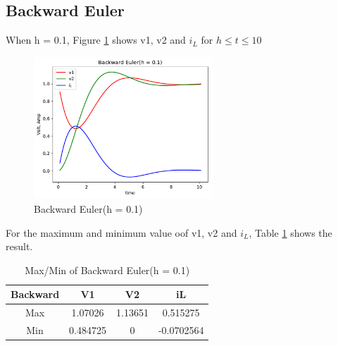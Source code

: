 \documentclass{article}
\begin{document}
\subsection{Backward Euler}
When h = 0.1, Figure \ref{fig:back 01} shows v1, v2 and $i_L$ for $h \leq t \leq 10$
\begin{figure}[H]
    \centering
    \includegraphics[width=0.6\textwidth]{src/back_01.pdf}
    \caption{Backward Euler(h = 0.1)}
    \label{fig:back 01}
\end{figure}
For the maximum and minimum value oof v1, v2 and $i_L$, Table \ref{tab:back 01} shows the result.
\begin{table}[H]
    \begin{center}
        \begin{tabular}{|c|c|c|c|}
            \hline
            Backward & V1 & V2 & iL \\ \hline
            Max & 1.07026 & 1.13651 & 0.515275 \\ \hline
            Min & 0.484725 & 0 & -0.0702564 \\ \hline
        \end{tabular}
    \end{center}
    \caption{Max/Min of Backward Euler(h = 0.1)}
    \label{tab:back 01}
\end{table}
\end{document}
